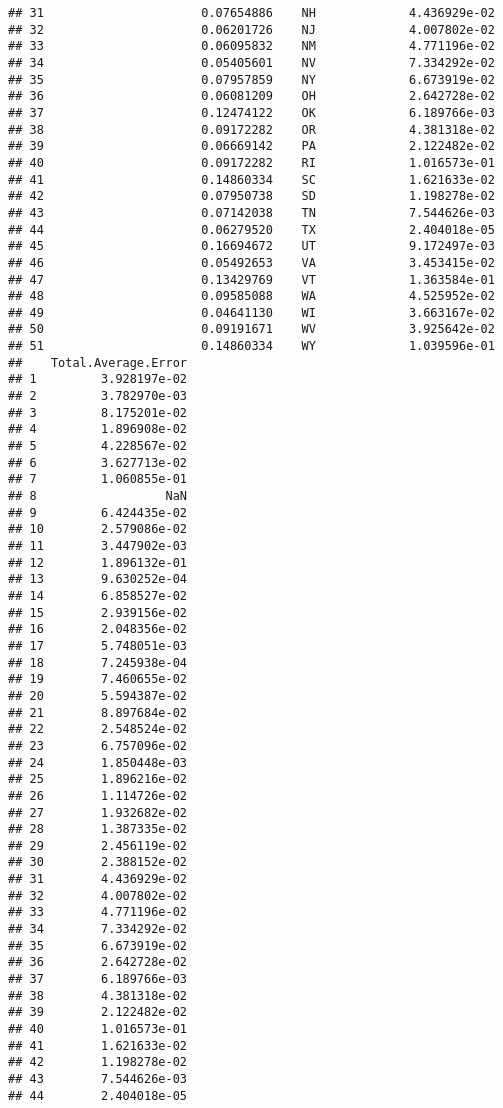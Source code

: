 \documentclass{article}\usepackage[]{graphicx}\usepackage[]{color}
\makeatletter
\newenvironment{kframe}{%
 \def\at@end@of@kframe{}%
 \ifinner\ifhmode%
  \def\at@end@of@kframe{\end{minipage}}%
  \begin{minipage}{\columnwidth}%
 \fi\fi%
 \def\FrameCommand##1{\hskip\@totalleftmargin \hskip-\fboxsep
 \colorbox{shadecolor}{##1}\hskip-\fboxsep
     \hskip-\linewidth \hskip-\@totalleftmargin \hskip\columnwidth}%
 \MakeFramed {\advance\hsize-\width
   \@totalleftmargin\z@ \linewidth\hsize
   \@setminipage}}%
 {\par\unskip\endMakeFramed%
 \at@end@of@kframe}
\newenvironment{knitrout}{}{} %
\makeatother
\begin{document}
\begin{knitrout}
\begin{kframe}
\begin{verbatim}
## 31                      0.07654886    NH             4.436929e-02
## 32                      0.06201726    NJ             4.007802e-02
## 33                      0.06095832    NM             4.771196e-02
## 34                      0.05405601    NV             7.334292e-02
## 35                      0.07957859    NY             6.673919e-02
## 36                      0.06081209    OH             2.642728e-02
## 37                      0.12474122    OK             6.189766e-03
## 38                      0.09172282    OR             4.381318e-02
## 39                      0.06669142    PA             2.122482e-02
## 40                      0.09172282    RI             1.016573e-01
## 41                      0.14860334    SC             1.621633e-02
## 42                      0.07950738    SD             1.198278e-02
## 43                      0.07142038    TN             7.544626e-03
## 44                      0.06279520    TX             2.404018e-05
## 45                      0.16694672    UT             9.172497e-03
## 46                      0.05492653    VA             3.453415e-02
## 47                      0.13429769    VT             1.363584e-01
## 48                      0.09585088    WA             4.525952e-02
## 49                      0.04641130    WI             3.663167e-02
## 50                      0.09191671    WV             3.925642e-02
## 51                      0.14860334    WY             1.039596e-01
##    Total.Average.Error
## 1         3.928197e-02
## 2         3.782970e-03
## 3         8.175201e-02
## 4         1.896908e-02
## 5         4.228567e-02
## 6         3.627713e-02
## 7         1.060855e-01
## 8                  NaN
## 9         6.424435e-02
## 10        2.579086e-02
## 11        3.447902e-03
## 12        1.896132e-01
## 13        9.630252e-04
## 14        6.858527e-02
## 15        2.939156e-02
## 16        2.048356e-02
## 17        5.748051e-03
## 18        7.245938e-04
## 19        7.460655e-02
## 20        5.594387e-02
## 21        8.897684e-02
## 22        2.548524e-02
## 23        6.757096e-02
## 24        1.850448e-03
## 25        1.896216e-02
## 26        1.114726e-02
## 27        1.932682e-02
## 28        1.387335e-02
## 29        2.456119e-02
## 30        2.388152e-02
## 31        4.436929e-02
## 32        4.007802e-02
## 33        4.771196e-02
## 34        7.334292e-02
## 35        6.673919e-02
## 36        2.642728e-02
## 37        6.189766e-03
## 38        4.381318e-02
## 39        2.122482e-02
## 40        1.016573e-01
## 41        1.621633e-02
## 42        1.198278e-02
## 43        7.544626e-03
## 44        2.404018e-05

\end{verbatim}
\end{kframe}
\end{knitrout}
\end{document}
